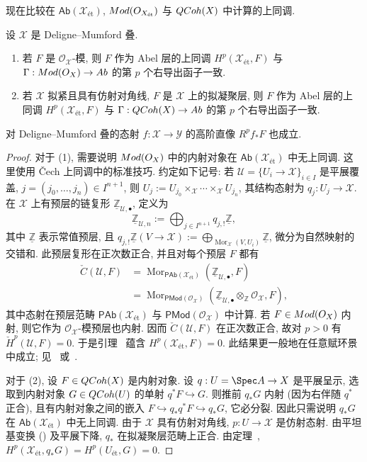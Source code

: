 现在比较在 $\mathsf{Ab}(\mathcal X_{\text{ét}})$, $Mod(O_{X_{\text{ét}}})$ 与 $QCoh(X)$ 中计算的上同调.
\begin{proposition}\label{src:5.1.42}
设 $\mathcal X$ 是 Deligne--Mumford 叠.
\begin{enumerate}[(1)]
\item 若 $F$ 是 $\mathcal O_{\mathcal X}$-模, 则 $F$ 作为 Abel 层的上同调 $H^p(\mathcal X_{\text{ét}},F)$ 与 $\Gamma:Mod(O_{X})\to Ab$ 的第 $p$ 个右导出函子一致.
\item 若 $\mathcal X$ 拟紧且具有仿射对角线, $F$ 是 $\mathcal X$ 上的拟凝聚层, 则 $F$ 作为 Abel 层的上同调 $H^p(\mathcal X_{\text{ét}},F)$ 与 $\Gamma:QCoh(X)\to Ab$ 的第 $p$ 个右导出函子一致.
\end{enumerate}
对 Deligne--Mumford 叠的态射 $f:\mathcal X\to\mathcal Y$ 的高阶直像 $R^pf_*F$ 也成立.
\end{proposition}
\begin{proof}
对于 (1), 需要说明 $Mod(O_{X})$ 中的内射对象在 $\mathsf{Ab}(\mathcal X_{\text{ét}})$ 中无上同调. 这里使用 Čech 上同调中的标准技巧. 约定如下记号: 若 $\mathcal U=\{U_i\to\mathcal X\}_{i\in I}$ 是平展覆盖, $j=(j_0,\ldots,j_n)\in I^{n+1}$, 则 $U_j:=U_{j_0}\times_{\mathcal X}\cdots\times_{\mathcal X}U_{j_n}$, 其结构态射为 $q_j:U_j\to\mathcal X$. 在 $\mathcal X$ 上有预层的链复形 $\underline{\mathbb Z}_{\mathcal U,\bullet}$, 定义为
\[
\underline{\mathbb Z}_{\mathcal U,n}:=\bigoplus_{j\in I^{n+1}}q_{j,!}\underline{\mathbb Z},
\]
其中 $\underline{\mathbb Z}$ 表示常值预层, 且 $q_{j,!}\underline{\mathbb Z}(V\to\mathcal X):=\bigoplus_{\operatorname{Mor}_{\mathcal X}(V,U_i)}\underline{\mathbb Z}$, 微分为自然映射的交错和. 此预层复形在正次数正合, 并且对每个预层 $F$ 都有
\[
\begin{aligned}
\check C(\mathcal U,F)&=\operatorname{Mor}_{\mathsf{PAb}(\mathcal X_{\text{ét}})}(\underline{\mathbb Z}_{\mathcal U,\bullet},F)\\
&=\operatorname{Mor}_{\mathsf{PMod}(\mathcal O_{\mathcal X})}(\underline{\mathbb Z}_{\mathcal U,\bullet}\otimes_{\mathbb Z}\mathcal O_{\mathcal X},F),
\end{aligned}
\]
其中态射在预层范畴 $\mathsf{PAb}(\mathcal X_{\text{ét}})$ 与 $\mathsf{PMod}(\mathcal O_{\mathcal X})$ 中计算. 若 $F\in Mod(O_{X})$ 内射, 则它作为 $\mathcal O_{\mathcal X}$-模预层也内射. 因而 $\check C(\mathcal U,F)$ 在正次数正合, 故对 $p>0$ 有 $\check H^p(\mathcal U,F)=0$. 于是引理~ 蕴含 $H^p(\mathcal X_{\text{ét}},F)=0$. 此结果更一般地在任意赋环景中成立; 见~\cite[推论 2.3.16]{Ols16} 或~\cite[Tag 03FD]{SP}.

对于 (2), 设 $F\in QCoh(X)$ 是内射对象. 设 $q:U=\Spec A\to\mathcal X$ 是平展呈示, 选取到内射对象 $G\in QCoh(U)$ 的单射 $q^*F\hookrightarrow G$. 则推前 $q_*G$ 内射 (因为右伴随 $q^*$ 正合), 且有内射对象之间的嵌入 $F\hookrightarrow q_*q^*F\hookrightarrow q_*G$, 它必分裂. 因此只需说明 $q_*G$ 在 $\mathsf{Ab}(\mathcal X_{\text{ét}})$ 中无上同调. 由于 $\mathcal X$ 具有仿射对角线, $p:U\to\mathcal X$ 是仿射态射. 由平坦基变换 () 及平展下降, $q_*$ 在拟凝聚层范畴上正合. 由定理~, $H^p(\mathcal X_{\text{ét}},q_*G)=H^p(U_{\text{ét}},G)=0$.
\end{proof}
